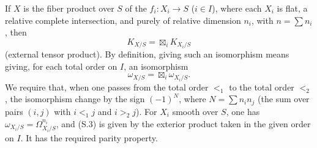 \documentclass[11pt,leqno]{article}
\begin{document}
If $X$ is the fiber product over $S$ of the $f_i:X_i\to S$ ($i\in I$), where each $X_i$ is flat, a relative complete intersection, and purely of relative dimension $n_i$, with $n=\sum n_i$, then
\begin{equation}
        K_{X/S}=\boxtimes_i K_{X_i/S} \tag{S.2}
\end{equation}
(external tensor product). By definition, giving such an isomorphism means giving, for each total order on $I$, an isomorphism
\begin{equation}
        \omega_{X/S}=\boxtimes_i\omega_{X_i/S}. \tag{S.3}
\end{equation}
We require that, when one passes from the total order $<_1$ to the total order $<_2$, the isomorphism change by the sign $(-1)^N$, where $N=\sum n_in_j$ (the sum over pairs $(i,j)$ with $i<_1j$ and $i>_2j$). For $X_i$ smooth over $S$, one has $\omega_{X_i/S}=\Omega^{n_i}_{X_i/S}$, and (S.3) is given by the exterior product taken in the given order on $I$. It has the required parity property.
\end{document}
